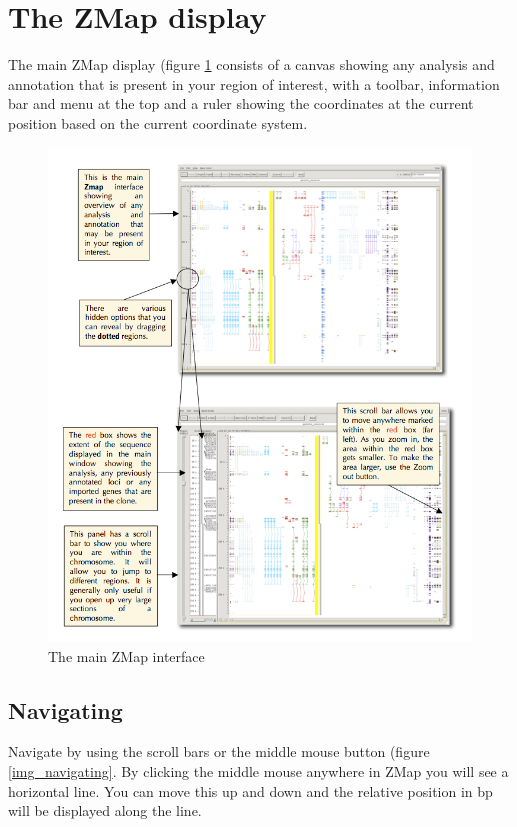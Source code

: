\documentclass[letterpaper]{article}
\begin{document}
\section{The ZMap display}

The main ZMap display (figure \ref{img_main_interface} consists of a canvas showing any analysis and annotation that is present in your region of interest, with a toolbar, information bar and menu at the top and a ruler showing the coordinates at the current position based on the current coordinate system.

\begin{figure}
\centering
\color[rgb]{0.30980393,0.5058824,0.7411765}
\includegraphics[width=15.231cm]{img_main_interface.png}
\caption{The main ZMap interface}
\label{img_main_interface}
\end{figure}

\subsection{Navigating}
Navigate by using the scroll bars or the middle mouse button (figure \ref{img_navigating}. By clicking the middle mouse anywhere in ZMap you will see a horizontal line. You can move this up and down and the relative position in bp will be displayed along the line.
\end{document}

